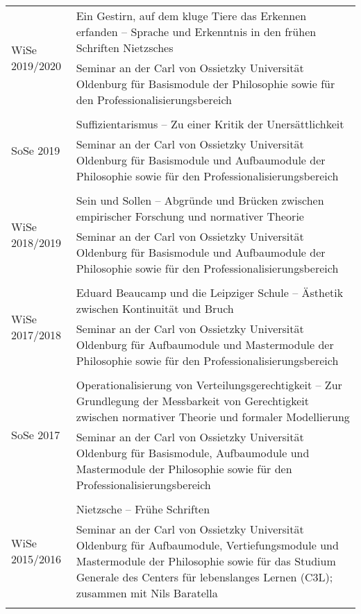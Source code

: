 \documentclass[a4paper,10pt]{article}
\begin{document}
\begin{longtable}{p{2cm}p{}}
\\
\multirow{2}{2cm}{\footnotesize{WiSe 2019/2020}} & Ein Gestirn, auf dem kluge Tiere das Erkennen erfanden -- Sprache und Erkenntnis in den frühen Schriften Nietzsches\\
& \footnotesize{Seminar an der Carl von Ossietzky Universität Oldenburg für Basismodule der Philosophie sowie für den Professionalisierungsbereich}\\
\\
\multirow{2}{2cm}{\footnotesize{SoSe 2019}} & Suffizientarismus -- Zu einer Kritik der Unersättlichkeit\\
& \footnotesize{Seminar an der Carl von Ossietzky Universität Oldenburg für Basismodule und Aufbaumodule der Philosophie sowie für den Professionalisierungsbereich}\\
\\
\multirow{2}{2cm}{\footnotesize{WiSe 2018/2019}} & Sein und Sollen -- Abgründe und Brücken zwischen empirischer Forschung und normativer Theorie\\
& \footnotesize{Seminar an der Carl von Ossietzky Universität Oldenburg für Basismodule und Aufbaumodule der Philosophie sowie für den Professionalisierungsbereich}\\
\\
\multirow{2}{2cm}{\footnotesize{WiSe 2017/2018}} & Eduard Beaucamp und die Leipziger Schule -- Ästhetik zwischen Kontinuität und Bruch\\
& \footnotesize{Seminar an der Carl von Ossietzky Universität Oldenburg für Aufbaumodule und Mastermodule der Philosophie sowie für den Professionalisierungsbereich}\\
\\
\multirow{2}{2cm}{\footnotesize{SoSe 2017}} & Operationalisierung von Verteilungsgerechtigkeit -- Zur Grundlegung der Messbarkeit von Gerechtigkeit zwischen normativer Theorie und formaler Modellierung\\
& \footnotesize{Seminar an der Carl von Ossietzky Universität Oldenburg für Basismodule, Aufbaumodule und Mastermodule der Philosophie sowie für den Professionalisierungsbereich}\\
\\
\multirow{2}{2cm}{\footnotesize{WiSe 2015/2016}} & Nietzsche -- Frühe Schriften\\
& \footnotesize{Seminar an der Carl von Ossietzky Universität Oldenburg für Aufbaumodule, Vertiefungsmodule und Mastermodule der Philosophie sowie für das Studium Generale des Centers für lebenslanges Lernen (C3L); zusammen mit Nils Baratella}\\
\\
\end{longtable}
\end{document}
